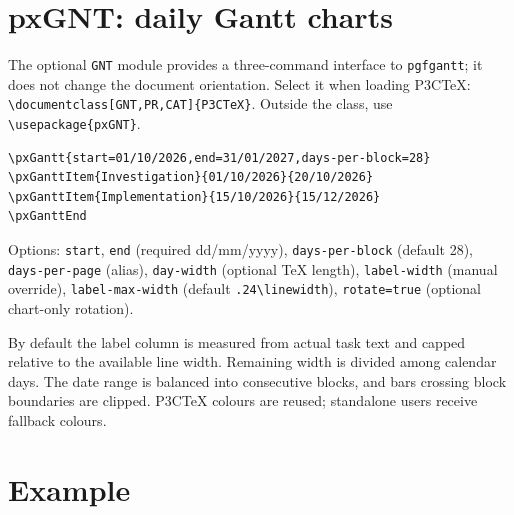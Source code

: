\documentclass[a4paper]{article}
\begin{document}
\section*{pxGNT: daily Gantt charts}
The optional \texttt{GNT} module provides a three-command interface to
\texttt{pgfgantt}; it does not change the document orientation.
Select it when loading P3CTeX: \verb|\documentclass[GNT,PR,CAT]{P3CTeX}|.
Outside the class, use \verb|\usepackage{pxGNT}|.

\begin{verbatim}
\pxGantt{start=01/10/2026,end=31/01/2027,days-per-block=28}
\pxGanttItem{Investigation}{01/10/2026}{20/10/2026}
\pxGanttItem{Implementation}{15/10/2026}{15/12/2026}
\pxGanttEnd
\end{verbatim}

Options: \texttt{start}, \texttt{end} (required dd/mm/yyyy),
\texttt{days-per-block} (default 28), \texttt{days-per-page} (alias),
\texttt{day-width} (optional TeX length), \texttt{label-width} (manual override),
\texttt{label-max-width} (default \verb|.24\linewidth|),
\texttt{rotate=true} (optional chart-only rotation).

By default the label column is measured from actual task text and capped
relative to the available line width. Remaining width is divided among
calendar days. The date range is balanced into consecutive blocks, and
bars crossing block boundaries are clipped. P3CTeX colours are reused;
standalone users receive fallback colours.

\section*{Example}
\pxGanttEnd
\end{document}
